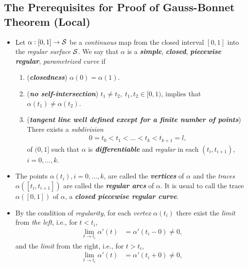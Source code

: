 \documentclass[11pt]{article}
\begin{document}
\subsection{The Prerequisites for Proof of Gauss-Bonnet Theorem (Local)}
\begin{itemize}
\item \begin{definition}
Let $\alpha: [0, 1] \rightarrow {\mathcal S}$ be a \emph{continuous} map from the closed interval $[0, 1]$ into the \emph{regular surface} ${\mathcal S}$. We say that $\alpha$ is a \emph{\textbf{simple}}, \emph{\textbf{closed}}, \emph{\textbf{piecewise regular}}, \emph{parametrized curve} if
\begin{enumerate}
\item (\emph{\textbf{closedness}}) $\alpha(0) = \alpha(1).$
\item (\emph{\textbf{no self-intersection}}) $ t_1 \neq t_2, \; t_1, t_2 \in [0,1)$, implies that $\alpha(t_1) \neq \alpha(t_2).$
\item (\emph{\textbf{tangent line well defined except for a finite number of points}})\\ 
There exists a \emph{subdivision} 
\begin{align*}
0= t_0 < t_1 < \ldots < t_k < t_{k+1} = l,
\end{align*} of $(0,1]$ such that $\alpha$ is \emph{\textbf{differentiable}} and \emph{regular} in each $(t_i,t_{i+1})$, $i = 0,\ldots,k$.
\end{enumerate}
\end{definition}

\item The points $\alpha(t_i), i = 0, \ldots, k$, are called the \emph{\textbf{vertices}} of $\alpha$ and the \emph{traces} $\alpha([t_i , t_{i+1}])$ are called the \emph{\textbf{regular arcs}} of $\alpha$. It is usual to call the trace $\alpha([0, 1])$ of $\alpha$, a \emph{\textbf{closed piecewise regular curve}}.

\item By the condition of \emph{regularity}, for each \emph{vertex} $\alpha(t_i)$ there exist the \emph{limit} from \emph{the left}, i.e., for $t < t_i$,
\begin{align*}
\lim_{t \rightarrow t_i}\alpha'(t) &=  \alpha'(t_i - 0) \neq 0, 
\end{align*}
and the \emph{limit} from the right, i.e., for $t > t_i$, 
\begin{align*}
\lim_{t \rightarrow t_i}\alpha'(t) &=  \alpha'(t_i + 0) \neq 0, 
\end{align*}


\end{itemize}
\end{document}
